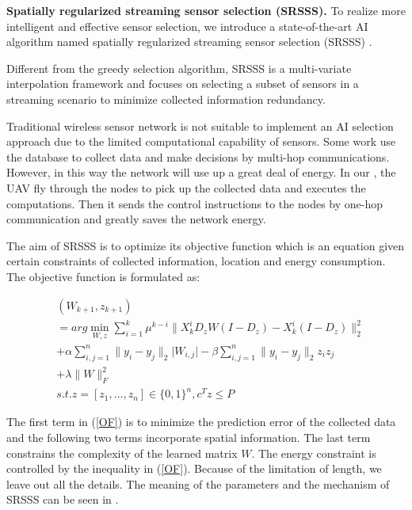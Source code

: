 \textbf{Spatially regularized streaming sensor selection (SRSSS).} 
To realize more intelligent and effective sensor selection, we introduce 
a state-of-the-art AI algorithm named spatially regularized streaming 
sensor selection (SRSSS) \cite{li2016spatially}.

Different from the greedy selection algorithm, SRSSS is a multi-variate 
interpolation framework and focuses on selecting a subset
of sensors in a streaming scenario to minimize collected information redundancy.  

Traditional wireless sensor network is not suitable to implement an AI selection approach
due to the limited computational capability of sensors. Some work use the database to collect data
and make decisions by multi-hop communications. However, in this way the network will use up a great deal of energy.
In our {\sdn}, the UAV fly through the nodes to pick up the collected data and executes the computations.
Then it sends the control instructions to the nodes by one-hop communication and greatly saves the network energy.

The aim of SRSSS is to optimize its objective function which is an equation given
certain constraints of collected information, location and energy consumption.
The objective function is formulated as:

\begin{equation}
\label{OF}
\begin{aligned}
& (W_{k+1},z_{k+1})  \\
& = arg \min_{W,z} \sum_{i=1}^k \mu^{k-i}\lVert X_k^iD_zW(I-D_z)-X_k^i(I-D_z)\rVert^2_2 \\
& + \alpha\sum_{i,j=1}^n\lVert y_i-y_j\rVert_2\lvert W_{i,j} \rvert - \beta\sum_{i,j=1}^n\lVert y_i-y_j\rVert_2 z_iz_j \\
& + \lambda\lVert W \rVert^2_F \\
&s.t. z = [z_1,...,z_n] \in {\{0,1\}}^n, c^Tz \leq P
\end{aligned}
\end{equation}

The first term in (\ref{OF}) is to minimize the prediction error of the collected data
and the following two terms incorporate spatial information. The last term constrains
the complexity of the learned matrix $W$. The energy constraint is controlled by 
the inequality in (\ref{OF}). Because of the limitation of length,  we leave out all the details. 
The meaning of the parameters and the mechanism of 
SRSSS can be seen in \cite{li2016spatially}. 


